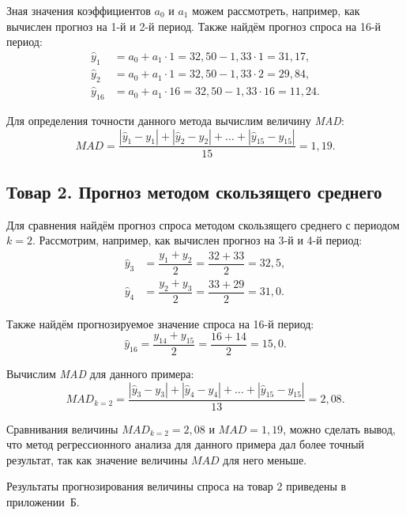 Зная значения коэффициентов $a_0$ и $a_1$ можем рассмотреть, например, как
вычислен прогноз на 1-й и 2-й период. Также найдём
прогноз спроса на 16-й период:
\begin{align*}
  \hat{y}_1 &= a_0 + a_1 \cdot 1 = 32{,}50 - 1{,}33 \cdot 1 = 31{,}17 , \\
  \hat{y}_2 &= a_0 + a_1 \cdot 1 =  32{,}50 - 1{,}33 \cdot 2 = 29{,}84, \\
  \hat{y}_{16} &= a_0 + a_1 \cdot 16 =  32{,}50 - 1{,}33 \cdot 16 = 11{,}24.
\end{align*}

Для определения точности данного метода вычислим величину \textit{MAD}:
\[
  MAD = \dfrac{|\hat{y}_1 - y_1| + |\hat{y}_2 - y_2| + \dots + |\hat{y}_{15} - y_{15}|}{15} = 1{,}19.
\]


\subsection{Товар 2. Прогноз методом скользящего среднего}

Для сравнения найдём прогноз спроса методом скользящего среднего
с периодом $k = 2$. Рассмотрим, например, как вычислен прогноз
на 3-й и 4-й период:
\begin{align*}
  \hat{y}_3 &= \dfrac{y_1 + y_2}{2} = \dfrac{32 + 33}{2} = 32{,}5, \\
  \hat{y}_4 &= \dfrac{y_2 + y_3}{2} = \dfrac{33 + 29}{2} = 31{,}0.
\end{align*}

Также найдём прогнозируемое значение спроса на 16-й период:
\begin{equation*}
  \hat{y}_{16} = \dfrac{y_{14} + y_{15}}{2} = \dfrac{16 + 14}{2} = 15{,}0.
\end{equation*}

Вычислим \textit{MAD} для данного примера:
\[
  MAD_{k = 2} = \dfrac{|\hat{y}_3 - y_3| + |\hat{y}_4 - y_4| + \dots + |\hat{y}_{15} - y_{15}|}{13} = 2{,}08.
\]

Сравнивания величины $MAD_{k = 2} = 2{,}08$ и $MAD = 1{,}19$, можно сделать вывод, что
метод регрессионного анализа для данного примера дал более точный результат, так как
значение величины $MAD$ для него меньше.

Результаты прогнозирования величины спроса на товар 2 приведены в приложении~Б.
